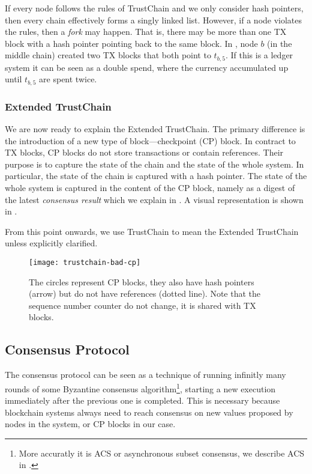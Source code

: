 If every node follows the rules of TrustChain and we only consider hash pointers,
then every chain effectively forms a singly linked list.
However, if a node violates the rules, then a \emph{fork} may happen.
That is, there may be more than one TX block with a hash pointer pointing back to the same block.
In , node $b$ (in the middle chain) created two TX blocks that both point to $t_{b, 5}$.
If this is a ledger system it can be seen as a double spend, where the currency accumulated up until $t_{b, 5}$ are spent twice.

\subsubsection*{Extended TrustChain}
We are now ready to explain the Extended TrustChain.
The primary difference is the introduction of a new type of block---checkpoint (CP) block.
In contract to TX blocks, CP blocks do not store transactions or contain references.
Their purpose is to capture the state of the chain and the state of the whole system.
In particular, the state of the chain is captured with a hash pointer.
The state of the whole system is captured in the content of the CP block,
namely as a digest of the latest \emph{consensus result} which we explain in .
A visual representation is shown in .

From this point onwards, we use TrustChain to mean the Extended TrustChain unless explicitly clarified.

\begin{figure}
    \texttt{[image: trustchain-bad-cp]}
    \centering
    \caption{The circles represent CP blocks,
    they also have hash pointers (arrow) but do not have references (dotted line).
    Note that the sequence number counter do not change, it is shared with TX blocks.}
    \label{fig:trustchain-bad-cp}
\end{figure}

\subsection{Consensus Protocol}\label{sec:overview-cons}

The consensus protocol can be seen as a technique of running infinitly many rounds of some 
Byzantine consensus algorithm\footnote{More accuratly it is ACS or asynchronous subset consensus, we describe ACS in .},
starting a new execution immediately after the previous one is completed.
This is necessary because blockchain systems always need to reach consensus on new values proposed by nodes in the system,
or CP blocks in our case.

